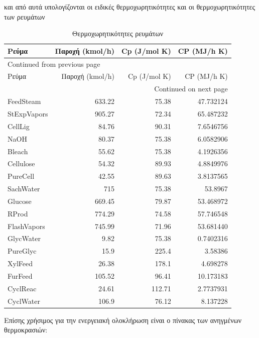 \documentclass[11pt]{article}
\begin{document}
και από αυτά υπολογίζονται οι ειδικές θερμοχωρητικότητες και οι θερμοχωρητικότητες των ρευμάτων
\begin{longtable}{lrrr}
\caption{Θερμοχωρητικότητες ρευμάτων}
\\
Ρεύμα & Παροχή (kmol/h) & Cp (J/mol K) & CP (MJ/h K)\\
\hline
\endfirsthead
\multicolumn{4}{l}{Continued from previous page} \\
\hline

Ρεύμα & Παροχή (kmol/h) & Cp (J/mol K) & CP (MJ/h K) \\

\hline
\endhead
\hline\multicolumn{4}{r}{Continued on next page} \\
\endfoot
\endlastfoot
\hline
FeedSteam & 633.22 & 75.38 & 47.732124\\
StExpVapors & 905.27 & 72.34 & 65.487232\\
CellLig & 84.76 & 90.31 & 7.6546756\\
NaOH & 80.37 & 75.38 & 6.0582906\\
Bleach & 55.62 & 75.38 & 4.1926356\\
Cellulose & 54.32 & 89.93 & 4.8849976\\
PureCell & 42.55 & 89.63 & 3.8137565\\
SachWater & 715 & 75.38 & 53.8967\\
Glucose & 669.45 & 79.87 & 53.468972\\
RProd & 774.29 & 74.58 & 57.746548\\
FlashVapors & 745.99 & 71.96 & 53.681440\\
GlycWater & 9.82 & 75.38 & 0.7402316\\
PureGlyc & 15.9 & 225.4 & 3.58386\\
XylFeed & 26.38 & 178.1 & 4.698278\\
FurFeed & 105.52 & 96.41 & 10.173183\\
CyclReac & 24.61 & 112.71 & 2.7737931\\
CyclWater & 106.9 & 76.12 & 8.137228\\
\end{longtable}

Επίσης χρήσιμος για την ενεργειακή ολοκλήρωση είναι ο πίνακας των ανηγμένων θερμοκρασιών:
\end{document}
